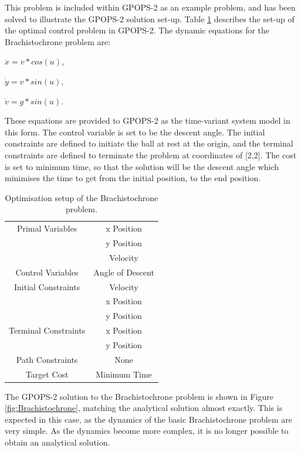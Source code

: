 This problem is included within GPOPS-2 as an example problem, and has been solved to illustrate the GPOPS-2 solution set-up\cite{Rao2010}. Table \ref{tab:brachistochrone} describes the set-up of the optimal control problem in GPOPS-2. The dynamic equations for the Brachistochrone problem are:

$\dot{x} = v*cos(u)$,

$\dot{y} = v*sin(u)$,

$\dot{v} = g*sin(u)$.

\noindent These equations are provided to GPOPS-2 as the time-variant system model in this form. The control variable is set to be the descent angle. The initial constraints are defined to initiate the ball at rest at the origin, and the terminal constraints are defined to terminate the problem at coordinates of [2,2]. The cost is set to minimum time, so that the solution will be the descent angle which minimises the time to get from the initial position, to the end position. 

\begin{table}
	\centering
	\begin{tabular}{|c|c|}
		\hline Primal Variables  & x Position\\& y Position\\& Velocity\\ 
		\hline Control Variables  & Angle of Descent\\ 
		\hline Initial Constraints  & Velocity\\ & x Position\\ & y Position\\
		\hline Terminal Constraints &  x Position\\ & y Position\\
		\hline Path Constraints & None \\ 
		\hline Target Cost & Minimum Time \\ 
		\hline 
	\end{tabular} 
	\caption{Optimisation setup of the Brachistochrone problem. }
	\label{tab:brachistochrone}
\end{table}


The GPOPS-2 solution to the Brachistochrone problem is shown in Figure \ref{fig:Brachistochrone}, matching the analytical solution almost exactly. This is expected in this case, as the dynamics of the basic Brachistochrone problem are very simple. As the dynamics become more complex, it is no longer possible to obtain an analytical solution.  


